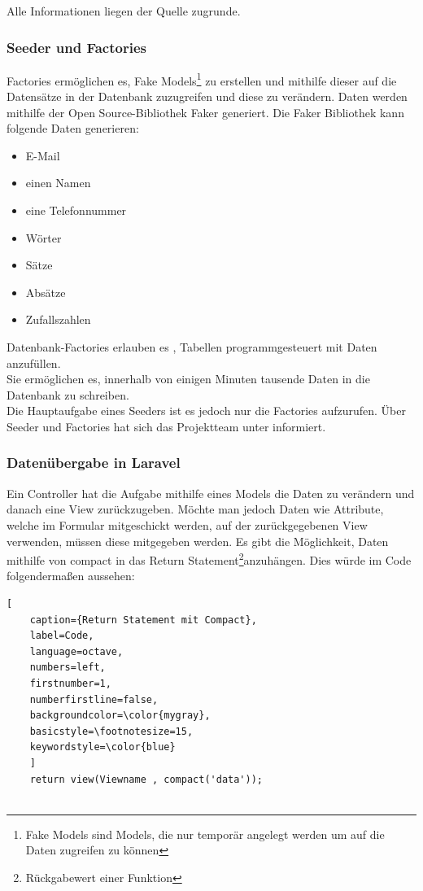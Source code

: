 Alle Informationen liegen der Quelle \cite{Migrations} zugrunde.
\newpage
\subsubsection{Seeder und Factories}
Factories ermöglichen es, Fake Models\footnote{Fake Models sind Models, die nur temporär angelegt werden um auf die Daten zugreifen zu können} zu erstellen und mithilfe dieser auf die Datensätze in der Datenbank zuzugreifen und diese zu verändern. Daten werden mithilfe der Open Source-Bibliothek Faker generiert. Die Faker Bibliothek kann folgende Daten generieren: 



\begin{itemize}
	\item E-Mail 
	\item einen Namen
	\item eine Telefonnummer 
	\item Wörter
	\item Sätze 
	\item Absätze
	\item Zufallszahlen
\end{itemize}

Datenbank-Factories  erlauben es , Tabellen programmgesteuert mit Daten anzufüllen. \\Sie ermöglichen es, innerhalb von einigen Minuten tausende Daten in die Datenbank zu schreiben.\\
Die Hauptaufgabe eines Seeders ist es jedoch nur die Factories aufzurufen. Über Seeder und Factories hat sich das Projektteam unter \cite{seeder} informiert.

\subsubsection{Datenübergabe in Laravel}
Ein Controller hat die Aufgabe mithilfe eines Models die Daten zu verändern und danach eine View zurückzugeben. Möchte man jedoch Daten wie Attribute, welche im Formular mitgeschickt werden, auf der zurückgegebenen View verwenden, müssen diese mitgegeben werden.
Es gibt die Möglichkeit, Daten mithilfe von compact in das Return Statement\footnote{Rückgabewert einer Funktion}anzuhängen. Dies würde im Code folgendermaßen aussehen: 
\renewcommand{\lstlistingname}{Quellcode}

\begin{lstlisting}[
	caption={Return Statement mit Compact},
	label=Code,
	language=octave,
	numbers=left,
	firstnumber=1,
	numberfirstline=false,
	backgroundcolor=\color{mygray},
	basicstyle=\footnotesize=15,
	keywordstyle=\color{blue}
	]
	return view(Viewname , compact('data'));
	
\end{lstlisting}

